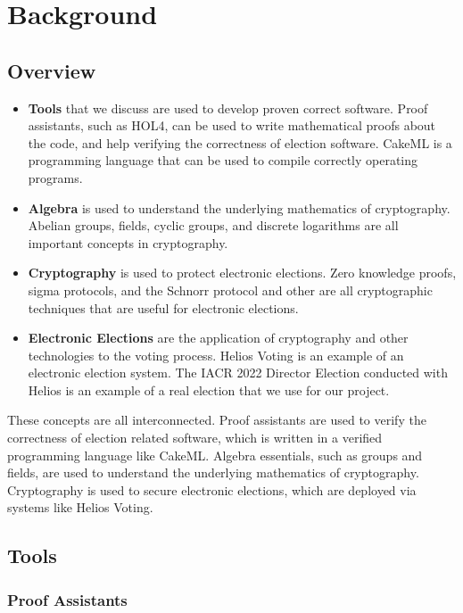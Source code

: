 \chapter{Background}


\section{Overview}
\begin{itemize}
\item \textbf{Tools} that we discuss are used to develop proven correct software. Proof assistants, such as HOL4, can be used to write mathematical proofs about the code, and help verifying the correctness of election software. CakeML is a programming language that can be used to compile correctly operating programs.

\item \textbf{Algebra} is used to understand the underlying mathematics of cryptography. Abelian groups, fields, cyclic groups, and discrete logarithms are all important concepts in cryptography.

\item \textbf{Cryptography} is used to protect electronic elections. Zero knowledge proofs, sigma protocols, and the Schnorr protocol and other are all cryptographic techniques that are useful for electronic elections.

\item \textbf{Electronic Elections} are the application of cryptography and other technologies to the voting process. Helios Voting is an example of an electronic election system. The IACR 2022 Director Election conducted with Helios is an example of a real election that we use for our project.
\end{itemize}

These concepts are all interconnected. Proof assistants are used to verify the correctness of election related software, which is written in a verified programming  language like CakeML. Algebra essentials, such as groups and fields, are used to understand the underlying mathematics of cryptography. Cryptography is used to secure electronic elections, which are deployed via systems like Helios Voting. 


\section{Tools}
\subsection{Proof Assistants}

